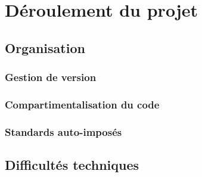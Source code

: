 \documentclass[a4paper,10pt]{report}
\begin{document}
\chapter{Déroulement du projet}
\section{Organisation}
\subsection{Gestion de version}

\subsection{Compartimentalisation du code}

\subsection{Standards auto-imposés}

\section{Difficultés techniques}
\end{document}
